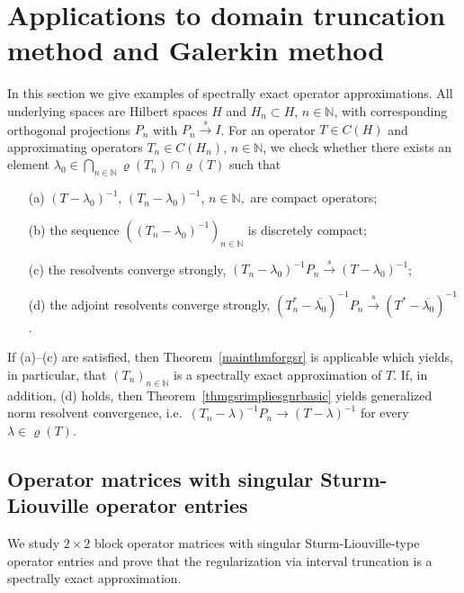 \documentclass[a4paper,reqno]{amsart}
\begin{document}
\section{Applications to domain truncation method and Galerkin method}\label{sectionapplications}
In this section we give examples of spectrally exact operator approximations. All underlying spaces are Hilbert spaces $H$ and $H_n\subset H$, $n\in{\mathbb{N}}$, with corresponding orthogonal projections $P_n$ with $P_n{\stackrel{s}{\rightarrow}} I$.
For an operator $T\in C(H)$ and approximating operators $T_n\in C(H_n)$, $n\in{\mathbb{N}}$,  we check whether there exists an element
$\lambda_0\in\underset{n\in{\mathbb{N}}}{\bigcap}\varrho(T_n)\cap\varrho(T)$ such that
\begin{enumerate}
\item[\rm (a)] $(T-\lambda_0)^{-1}$, $(T_n-\lambda_0)^{-1},\,n\in{\mathbb{N}},$ are compact operators;
\item[\rm (b)] the sequence $\left((T_n-\lambda_0)^{-1}\right)_{n\in{\mathbb{N}}}$ is discretely compact;
\item[\rm (c)] the resolvents converge strongly, $(T_n-\lambda_0)^{-1}P_n{\stackrel{s}{\rightarrow}} (T-\lambda_0)^{-1}$;
\item[\rm (d)] the adjoint resolvents converge strongly, $(T_n^*-\overline{\lambda_0})^{-1}P_n{\stackrel{s}{\rightarrow}} (T^*-\overline{\lambda_0})^{-1}$.
\end{enumerate}
If (a)--(c) are satisfied, then  Theorem~{\rm\ref{mainthmforgsr}} is applicable which yields, in particular, that $(T_n)_{n\in{\mathbb{N}}}$ is a spectrally exact approximation of $T$.
If, in addition, (d) holds, then Theorem~\ref{thmgsrimpliesgnrbasic} yields generalized norm resolvent convergence, i.e.\ $(T_n-\lambda)^{-1}P_n\to (T-\lambda)^{-1}$ for every $\lambda\in\varrho(T)$.

\subsection{Operator matrices with singular Sturm-Liouville operator entries}
We study $2\times 2$ block operator matrices with singular Sturm-Liouville-type operator entries
and prove that the regularization via interval truncation is a spectrally exact approximation.
\end{document}
